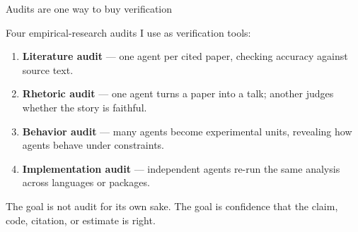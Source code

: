 \documentclass[aspectratio=169,11pt]{beamer}
\begin{document}
\begin{frame}{Audits are one way to buy verification}

Four empirical-research audits I use as verification tools:

\vspace{0.25cm}

\begin{enumerate}\setlength\itemsep{0.45em}
    \item \textbf{Literature audit} --- one agent per cited paper, checking accuracy against source text.
    \item \textbf{Rhetoric audit} --- one agent turns a paper into a talk; another judges whether the story is faithful.
    \item \textbf{Behavior audit} --- many agents become experimental units, revealing how agents behave under constraints.
    \item \textbf{Implementation audit} --- independent agents re-run the same analysis across languages or packages.
\end{enumerate}

\vspace{0.35cm}

\begin{center}
\alert{The goal is not audit for its own sake. The goal is confidence that the claim, code, citation, or estimate is right.}
\end{center}

\end{frame}
\end{document}
